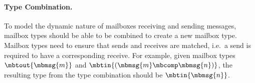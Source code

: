 
\paragraph{Type Combination.}
\label{sec:type-combiation}
To model the dynamic nature of mailboxes receiving and sending messages, mailbox types should be able to be combined to create a new mailbox type.
Mailbox types need to ensure that sends and receives are matched, i.e.\ a send is required to have a corresponding receive.
For example, given mailbox types $\mbtout{\mbmsg{m}}$ and $\mbtin{(\mbmsg{m} \mbcomp \mbmsg{n})}$,
the resulting type from the type combination should be $\mbtin{\mbmsg{n}}$.

